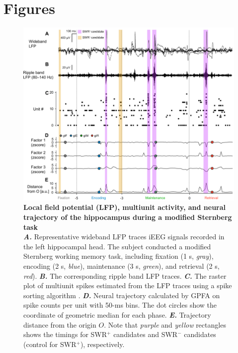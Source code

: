 \documentclass[final,3p,times,twocolumn]{elsarticle}
\begin{document}
\clearpage
\section*{Figures}
\label{figures}
        \clearpage
        \begin{figure}[ht]
        	\centering
            \includegraphics[width=1\textwidth]{./src/figures/.png/Figure_ID_01.png}
        	\caption{\textbf{
Local field potential (LFP), multiunit activity, and neural trajectory of the hippocampus during a modified Sternberg task
}
\smallskip
\\
\textbf{\textit{A.}} Representative wideband LFP traces iEEG signals recorded in the left hippocampal head. The subject conducted a modified Sternberg working memory task, including fixation (1 s, \textit{gray}), encoding (2 s, \textit{blue}), maintenance (3 s, \textit{green}), and retrieval (2 s, \textit{red}). \textbf{\textit{B.}} The corresponding ripple band LFP traces. \textbf{\textit{C.}} The raster plot of multiunit spikes estimated from the LFP traces using a spike sorting algorithm \cite{niediek_reliable_2016}. \textbf{\textit{D.}} Neural trajectory calculated by GPFA on spike counts per unit with 50-ms bins. The dot circles show the coordinate of geometric median for each phase. \textbf{\textit{E.}} Trajectory distance from the origin $O$. Note that \textit{purple} and \textit{yellow} rectangles shows the timings for SWR$^+$ candidates and SWR$^-$ candidates (control for SWR$^+$), respectively.
}
        	\label{fig:01}
        \end{figure}
\end{document}
